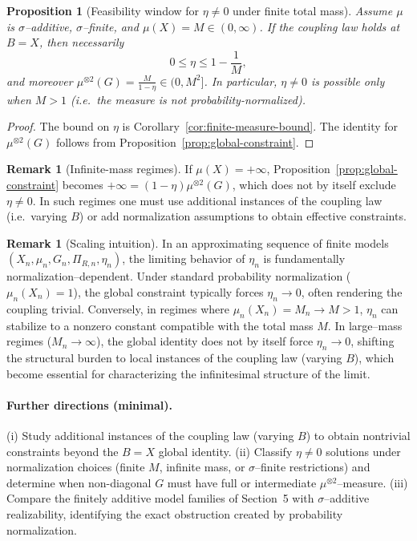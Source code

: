 \documentclass[11pt]{article}
\numberwithin{equation}{section}
\newtheorem{proposition}[theorem]{Proposition}
\theoremstyle{definition}
\newtheorem{remark}[theorem]{Remark}
\begin{document}
\begin{proposition}[Feasibility window for $\eta\neq 0$ under finite total mass]\label{prop:eta-window}
Assume $\mu$ is $\sigma$--additive, $\sigma$--finite, and $\mu(X)=M\in(0,\infty)$.
If the coupling law holds at $B=X$, then necessarily
\[
0\le \eta \le 1-\frac{1}{M},
\]
and moreover $\mu^{\otimes2}(G)=\frac{M}{1-\eta}\in(0,M^2]$.
In particular, $\eta\neq 0$ is possible only when $M>1$ (i.e.\ the measure is not probability-normalized).
\end{proposition}

\begin{proof}
The bound on $\eta$ is Corollary~\ref{cor:finite-measure-bound}.
The identity for $\mu^{\otimes2}(G)$ follows from Proposition~\ref{prop:global-constraint}.
\end{proof}

\begin{remark}[Infinite-mass regimes]\label{rem:infinite-mass}
If $\mu(X)=+\infty$, Proposition~\ref{prop:global-constraint} becomes $+\infty=(1-\eta)\mu^{\otimes2}(G)$, which does not by itself
exclude $\eta\neq 0$. In such regimes one must use additional instances of the coupling law (i.e.\ varying $B$) or add normalization
assumptions to obtain effective constraints.
\end{remark}

\begin{remark}[Scaling intuition]\label{rem:eta-scaling}
\sloppy
In an approximating sequence of finite models $(X_n,\allowbreak \mu_n,\allowbreak G_n,\allowbreak \Pi_{R,n},\allowbreak \eta_n)$, the limiting behavior of $\eta_n$ is fundamentally normalization--dependent. Under standard probability normalization ($\mu_n(X_n)=1$), the global constraint typically forces $\eta_n\to 0$, often rendering the coupling trivial. Conversely, in regimes where $\mu_n(X_n)=M_n\to M>1$, $\eta_n$ can stabilize to a nonzero constant compatible with the total mass $M$. In large--mass regimes ($M_n\to\infty$), the global identity does not by itself force $\eta_n\to 0$, shifting the structural burden to local instances of the coupling law (varying $B$), which become essential for characterizing the infinitesimal structure of the limit.
\end{remark}

\paragraph{Further directions (minimal).}
(i) Study additional instances of the coupling law (varying $B$) to obtain nontrivial constraints beyond the $B=X$ global identity.
(ii) Classify $\eta\neq 0$ solutions under normalization choices (finite $M$, infinite mass, or $\sigma$--finite restrictions) and determine when non-diagonal $G$ must have full or intermediate $\mu^{\otimes2}$--measure.
(iii) Compare the finitely additive model families of Section~5 with $\sigma$--additive realizability, identifying the exact obstruction created by probability normalization.
\end{document}
